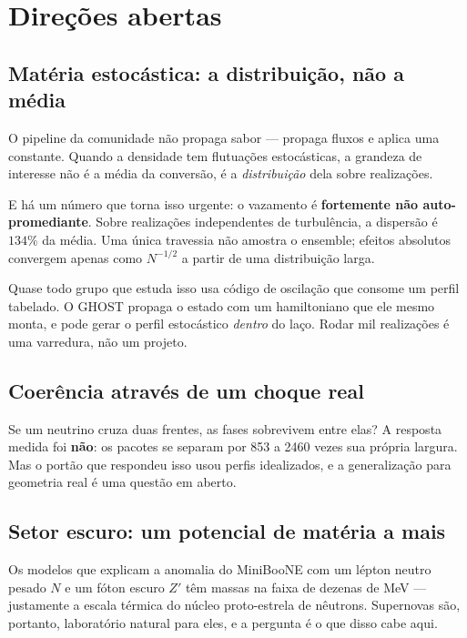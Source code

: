 \section{Direções abertas}

\subsection{Matéria estocástica: a distribuição, não a média}

O pipeline da comunidade não propaga sabor --- propaga fluxos e aplica uma
constante. Quando a densidade tem flutuações estocásticas, a grandeza de
interesse não é a média da conversão, é a \emph{distribuição} dela sobre
realizações.

E há um número que torna isso urgente: o vazamento é
\textbf{fortemente não auto-promediante}. Sobre realizações independentes de
turbulência, a dispersão é $134\%$ da média. Uma única travessia não amostra o
ensemble; efeitos absolutos convergem apenas como $N^{-1/2}$ a partir de uma
distribuição larga.

\begin{conceito}
Quase todo grupo que estuda isso usa código de oscilação que consome um perfil
tabelado. O GHOST propaga o estado com um hamiltoniano que ele mesmo monta, e
pode gerar o perfil estocástico \emph{dentro} do laço. Rodar mil realizações é
uma varredura, não um projeto.
\end{conceito}

\subsection{Coerência através de um choque real}

Se um neutrino cruza duas frentes, as fases sobrevivem entre elas? A resposta
medida foi \textbf{não}: os pacotes se separam por 853 a 2460 vezes sua própria
largura. Mas o portão que respondeu isso usou perfis idealizados, e a
generalização para geometria real é uma questão em aberto.

\subsection{Setor escuro: um potencial de matéria a mais}
\label{sec:setor-escuro}

Os modelos que explicam a anomalia do MiniBooNE com um lépton neutro pesado $N$
e um fóton escuro $Z'$ têm massas na faixa de dezenas de MeV --- justamente a
escala térmica do núcleo proto-estrela de nêutrons. Supernovas são, portanto,
laboratório natural para eles, e a pergunta é o que disso cabe aqui.

